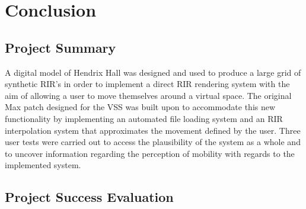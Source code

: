 \documentclass[../../main.tex]{subfiles}
\begin{document}
	\section{Conclusion}
	
		\subsection{Project Summary}
		A digital model of Hendrix Hall was designed and used to produce a large grid of synthetic \ac{RIR}'s in order to implement a direct \ac{RIR} rendering system with the aim of allowing a user to move themselves around a virtual space. The original Max patch designed for the \ac{VSS} was built upon to accommodate this new functionality by implementing an automated file loading system and an \ac{RIR} interpolation system that approximates the movement defined by the user. Three user tests were carried out to access the plausibility of the system as a whole and to uncover information regarding the perception of mobility with regards to the implemented system. 







		\subsection{Project Success Evaluation}
\end{document}
